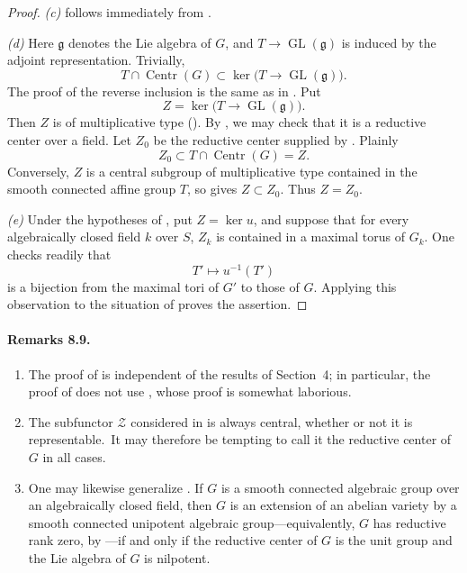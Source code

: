 \begin{proof}
\emph{(c)} follows immediately from \textup{}.

\emph{(d)} Here \(\mathfrak g\) denotes the Lie algebra of \(G\),
and \(T\to\operatorname{GL}(\mathfrak g)\) is induced by the adjoint
representation. Trivially,
\[
  T\cap\operatorname{Centr}(G)
  \subset
  \ker\bigl(T\longrightarrow\operatorname{GL}(\mathfrak g)\bigr).
\]
The proof of the reverse inclusion is the same as in . Put
\[
  Z=\ker\bigl(T\longrightarrow\operatorname{GL}(\mathfrak g)\bigr).
\]
Then \(Z\) is of multiplicative type (). By \textup{}, we
may check that it is a reductive center over a field. Let \(Z_0\)
be the reductive center supplied by \textup{}. Plainly
\[
  Z_0\subset T\cap\operatorname{Centr}(G)=Z.
\]
Conversely, \(Z\) is a central subgroup of multiplicative type
contained in the smooth connected affine group \(T\), so
\textup{} gives \(Z\subset Z_0\). Thus \(Z=Z_0\).

\emph{(e)} Under the hypotheses of , put \(Z=\ker u\), and
suppose that for every algebraically closed field \(k\) over \(S\),
\(Z_k\) is contained in a maximal torus of \(G_k\). One checks
readily that
\[
  T'\longmapsto u^{-1}(T')
\]
is a bijection from the maximal tori of \(G'\) to those of \(G\).
Applying this observation to the situation of \textup{} proves
the assertion.
\end{proof}

\paragraph{\textbf{Remarks 8.9.}}
\begin{enumerate}
\item[\emph{(a)}] The proof of  is independent of the results of
Section~4; in particular, the proof of  does not use ,
whose proof is somewhat laborious.

\item[\emph{(b)}] The subfunctor \(\mathcal Z\) considered in 
is always central, whether or not it is representable.\ It may
therefore be tempting to call it the reductive center of \(G\) in
all cases.

\item[\emph{(c)}] One may likewise generalize . If \(G\) is a
smooth connected algebraic group over an algebraically closed
field, then \(G\) is an extension of an abelian variety by a smooth
connected unipotent algebraic group---equivalently, \(G\) has
reductive rank zero, by ---if and only if the reductive center of
\(G\) is the unit group and the Lie algebra of \(G\) is nilpotent.
\end{enumerate}


